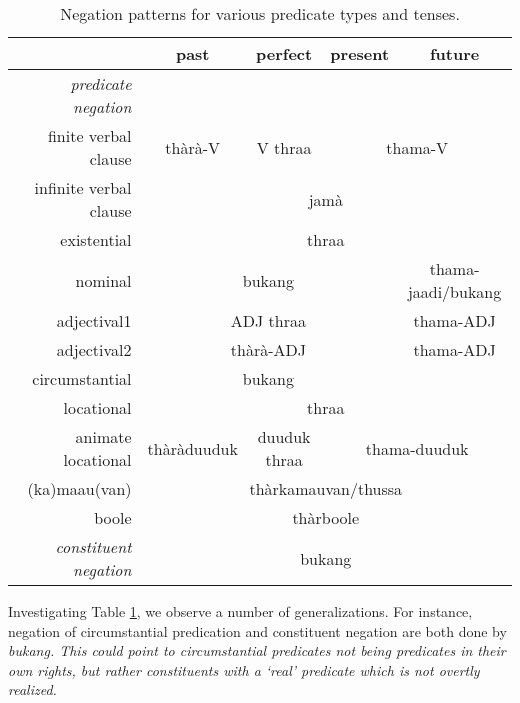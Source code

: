 \begin{table}
\begin{center}
\begin{tabular}{r|c|c|c|c|}
 & past & perfect & present & future \\\hline
\hline
\textit{predicate negation} & \multicolumn{4}{|c|}{~}  \\\hline
finite verbal clause & thàrà-V & V thraa &  \multicolumn{2}{|c|}{thama-V}  \\\hline
infinite verbal clause &  \multicolumn{4}{|c|}{jamà}  \\\hline
existential & \multicolumn{4}{|c|}{thraa}  \\\hline
nominal &  \multicolumn{3}{|c|}{bukang} & thama-jaadi/bukang \\\hline
adjectival1 &  \multicolumn{3}{|c|}{ADJ thraa} & thama-ADJ \\\hline
adjectival2 &  \multicolumn{3}{|c|}{thàrà-ADJ} & thama-ADJ \\\hline
circumstantial &  \multicolumn{3}{|c|}{bukang} &  \\\hline
locational & \multicolumn{4}{|c|}{thraa\footnotemark}  \\\hline
animate locational & thàràduuduk & duuduk thraa & \multicolumn{2}{|c|}{thama-duuduk}\\\hline
~(ka)maau(van) & \multicolumn{4}{|c|}{thàrkamauvan/thussa}  \\\hline
~boole & \multicolumn{4}{|c|}{thàrboole}   \\ \hline
\hline
\textit{constituent negation} &  \multicolumn{4}{|c|}{bukang} \\
\hline
\end{tabular}
\end{center}
\caption[Negation patterns for various predicate types and tenses]{Negation patterns for various predicate types and tenses.}
\label{tab:func:negation}
\end{table}

Investigating Table \ref{tab:func:negation}, we observe a number of generalizations. For instance, negation of circumstantial predication and constituent negation are both done by \em bukang\em. This could point to circumstantial predicates not being predicates in their own rights, but rather constituents with a `real' predicate which is not overtly realized.

